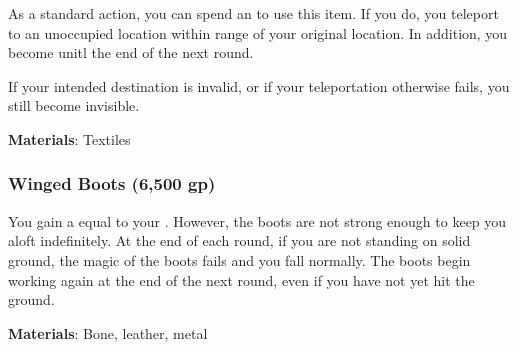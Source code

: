 As a standard action, you can spend an  to use this item.
If you do, you teleport to an unoccupied location within \rngmed range of your original location.
In addition, you become  unitl the end of the next round.

If your intended destination is invalid, or if your teleportation otherwise fails, you still become invisible.



\vspace{0.25em}
\textbf{Materials}: Textiles


\lowercase{\hypertarget{item:Winged Boots}{}}\label{item:Winged Boots}
\hypertarget{item:Winged Boots}{\subsubsection{Winged Boots\hfill{} (6,500 gp)}}

You gain a  equal to your .
However, the boots are not strong enough to keep you aloft indefinitely.
At the end of each round, if you are not standing on solid ground, the magic of the boots fails and you fall normally.
The boots begin working again at the end of the next round, even if you have not yet hit the ground.



\vspace{0.25em}
\textbf{Materials}: Bone, leather, metal
